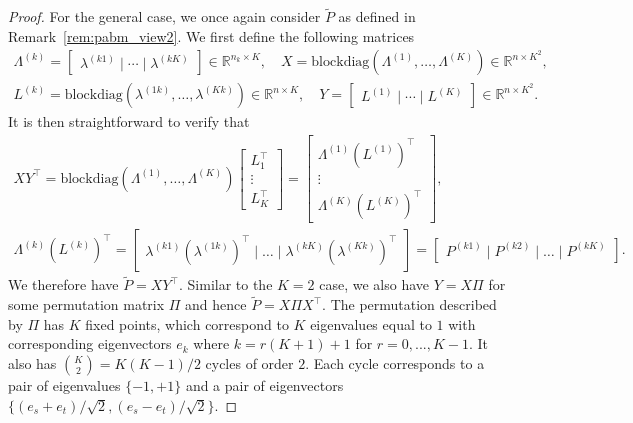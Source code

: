 \documentclass[12pt]{article}
\begin{document}
\begin{proof}
For the general case, we once again consider $\tilde{P}$ as defined in
Remark~\ref{rem:pabm_view2}.  
We first define the following matrices
\begin{gather}
\label{eq:xy}
\Lambda^{(k)} = \begin{bmatrix} \lambda^{(k1)} \mid \cdots \mid \lambda^{(kK)} \end{bmatrix}
\in \mathbb{R}^{n_k \times K}, \quad
X = \mathrm{blockdiag}(\Lambda^{(1)}, \dots, \Lambda^{(K)}) \in
\mathbb{R}^{n \times K^2}, \\
L^{(k)} = \mathrm{blockdiag}(\lambda^{(1k)}, \dots, \lambda^{(Kk)}) \in
\mathbb{R}^{n \times K}, \quad
Y = \begin{bmatrix} L^{(1)} \mid \cdots \mid L^{(K)} \end{bmatrix} \in
\mathbb{R}^{n \times K^2}.
\end{gather}
It is then straightforward to verify that
\begin{gather*}
  XY^{\top} = \mathrm{blockdiag}(\Lambda^{(1)}, \dots,
\Lambda^{(K)}) \begin{bmatrix} L_1^{\top} \\ \vdots \\
  L_{K}^{\top} \end{bmatrix} = \begin{bmatrix} \Lambda^{(1)}
  (L^{(1)})^{\top} \\ \vdots \\
  \Lambda^{(K)} (L^{(K)})^{\top} \end{bmatrix}, \\
\Lambda^{(k)} (L^{(k)})^{\top} = \begin{bmatrix} \lambda^{(k1)}
  (\lambda^{(1k)})^{\top} \mid \dots \mid \lambda^{(kK)}
  (\lambda^{(Kk)})^{\top} \end{bmatrix} = \begin{bmatrix} P^{(k1)}
  \mid P^{(k2)} \mid \dots \mid P^{(kK)} \end{bmatrix}.
\end{gather*}
We therefore have $\tilde{P} = X Y^\top$. 
Similar to the $K = 2$ case, we also have $Y = X \Pi$ for some permutation matrix
$\Pi$ and hence $\tilde{P} = X \Pi X^\top$.
The permutation described by $\Pi$ has $K$ fixed points, which correspond to
$K$ eigenvalues equal to $1$ with corresponding eigenvectors $e_k$ where
$k = r (K + 1) + 1$ for $r = 0, ..., K - 1$. It also has
$\binom{K}{2} = K (K - 1) / 2$ cycles of order $2$. Each cycle corresponds to
a pair of eigenvalues $\{-1,+1\}$ and a pair of eigenvectors
$\{(e_s + e_t)/\sqrt{2},(e_s - e_t)/ \sqrt{2}\}$.


\end{proof}
\end{document}
